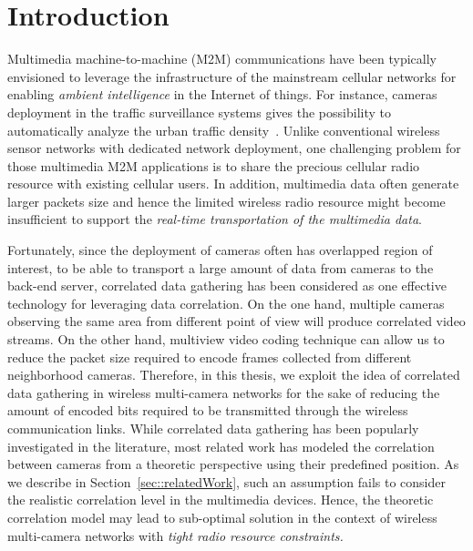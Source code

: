 \section{Introduction}
\label{sec::introduction}
Multimedia machine-to-machine (M2M) communications have been typically envisioned to leverage the infrastructure of the mainstream cellular networks for enabling {\em ambient intelligence} in the Internet of things.
For instance, cameras deployment in the traffic surveillance systems gives the possibility to automatically analyze the urban traffic density~\cite{Kapsch,Traficon,Citilog}.
%
Unlike conventional wireless sensor networks with dedicated network deployment, one challenging problem for those multimedia M2M applications is to share the precious cellular radio resource with existing cellular users.
%
In addition, multimedia data often generate larger packets size and hence the limited wireless radio resource might become insufficient to support the {\em real-time transportation of the multimedia data}.

Fortunately, since the deployment of cameras often has overlapped region of interest, to be able to transport a large amount of data from cameras to the back-end server, correlated data gathering has been considered as one effective technology for leveraging data correlation.
On the one hand, multiple cameras observing the same area from different point of view will produce correlated video streams. 
On the other hand, multiview video coding technique can allow us to reduce the packet size required to encode frames collected from different neighborhood cameras.
Therefore, in this thesis, we exploit the idea of correlated data gathering in wireless multi-camera networks for the sake of reducing the amount of encoded bits required to be transmitted through the wireless communication links.
%
While correlated data gathering has been popularly investigated in the literature, most related work has modeled the correlation between cameras from a theoretic perspective using their predefined position.
As we describe in Section~\ref{sec::relatedWork}, such an assumption fails to consider the realistic correlation level in the multimedia devices.
Hence, the theoretic correlation model may lead to sub-optimal solution in the context of wireless multi-camera networks with {\em tight radio resource constraints.}

